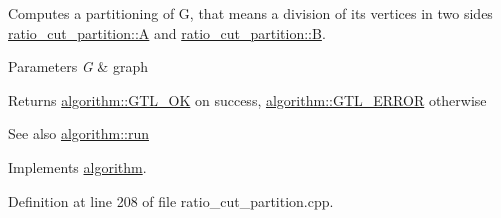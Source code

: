 Computes a partitioning of {\ttfamily G}, that means a division of its vertices in two sides {\ttfamily \mbox{\hyperlink{classratio__cut__partition_a9c0da5ad845b01bddbc1f238fa35cdd0}{ratio\+\_\+cut\+\_\+partition\+::A}}} and {\ttfamily \mbox{\hyperlink{classratio__cut__partition_adf075987228d8adc7950d5b1ba332daa}{ratio\+\_\+cut\+\_\+partition\+::B}}}.


\begin{DoxyParams}{Parameters}
{\em G} & graph \\
\hline
\end{DoxyParams}
\begin{DoxyReturn}{Returns}
{\ttfamily \mbox{\hyperlink{classalgorithm_af1a0078e153aa99c24f9bdf0d97f6710a5114c20e4a96a76b5de9f28bf15e282b}{algorithm\+::\+G\+T\+L\+\_\+\+OK}}} on success, {\ttfamily \mbox{\hyperlink{classalgorithm_af1a0078e153aa99c24f9bdf0d97f6710a6fcf574690bbd6cf710837a169510dd7}{algorithm\+::\+G\+T\+L\+\_\+\+E\+R\+R\+OR}}} otherwise 
\end{DoxyReturn}
\begin{DoxySeeAlso}{See also}
\mbox{\hyperlink{classalgorithm_a734b189509a8d6b56b65f8ff772d43ca}{algorithm\+::run}} 
\end{DoxySeeAlso}


Implements \mbox{\hyperlink{classalgorithm_a734b189509a8d6b56b65f8ff772d43ca}{algorithm}}.



Definition at line 208 of file ratio\+\_\+cut\+\_\+partition.\+cpp.


